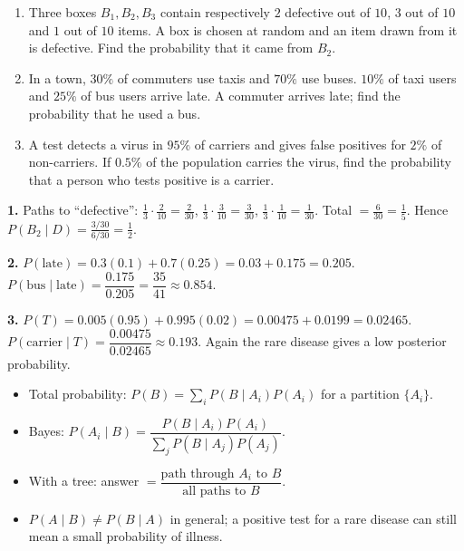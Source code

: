 \documentclass[11pt]{article}
\begin{document}
\begin{exercice}
\begin{enumerate}
\item Three boxes $B_1,B_2,B_3$ contain respectively $2$ defective out of $10$, $3$ out of $10$ and $1$ out of $10$ items. A box is chosen at random and an item drawn from it is defective. Find the probability that it came from $B_2$.
\item In a town, $30\%$ of commuters use taxis and $70\%$ use buses. $10\%$ of taxi users and $25\%$ of bus users arrive late. A commuter arrives late; find the probability that he used a bus.
\item A test detects a virus in $95\%$ of carriers and gives false positives for $2\%$ of non-carriers. If $0.5\%$ of the population carries the virus, find the probability that a person who tests positive is a carrier.
\end{enumerate}
\end{exercice}

\begin{corrige}[Exercise 1]
\textbf{1.} Paths to ``defective'': $\tfrac13\cdot\tfrac{2}{10}=\tfrac{2}{30}$, $\tfrac13\cdot\tfrac{3}{10}=\tfrac{3}{30}$, $\tfrac13\cdot\tfrac{1}{10}=\tfrac{1}{30}$. Total $=\tfrac{6}{30}=\tfrac15$. Hence $P(B_2\mid D)=\tfrac{3/30}{6/30}=\tfrac12$.

\textbf{2.} $P(\text{late})=0.3(0.1)+0.7(0.25)=0.03+0.175=0.205$. $P(\text{bus}\mid\text{late})=\dfrac{0.175}{0.205}=\dfrac{35}{41}\approx0.854$.

\textbf{3.} $P(T)=0.005(0.95)+0.995(0.02)=0.00475+0.0199=0.02465$. $P(\text{carrier}\mid T)=\dfrac{0.00475}{0.02465}\approx0.193$. Again the rare disease gives a low posterior probability.
\end{corrige}

\begin{aretenir}
\begin{itemize}
\item Total probability: $P(B)=\sum_i P(B\mid A_i)P(A_i)$ for a partition $\{A_i\}$.
\item Bayes: $P(A_i\mid B)=\dfrac{P(B\mid A_i)P(A_i)}{\sum_j P(B\mid A_j)P(A_j)}$.
\item With a tree: answer $=\dfrac{\text{path through }A_i\text{ to }B}{\text{all paths to }B}$.
\item $P(A\mid B)\neq P(B\mid A)$ in general; a positive test for a rare disease can still mean a small probability of illness.
\end{itemize}
\end{aretenir}
\end{document}
